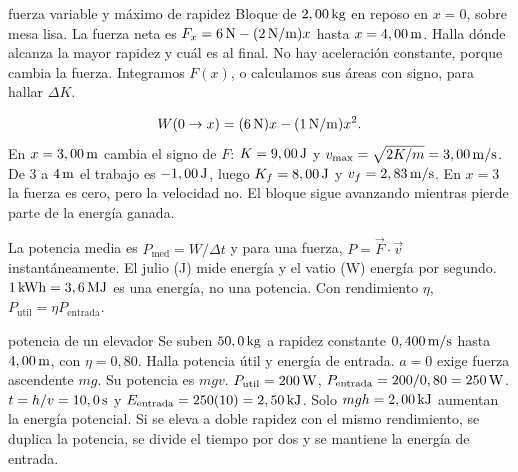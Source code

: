 \documentclass[11pt,a4paper]{article}
\begin{document}
\begin{examplebox}{fuerza variable y m\'aximo de rapidez}
 Bloque de $2,00\,\mathrm{kg}$ en reposo en $x=0$, sobre mesa lisa.
La fuerza neta es $F_x=6\,\mathrm{N}-(2\,\mathrm{N/m})x$ hasta $x=4,00\,\mathrm{m}$.
Halla d\'onde alcanza la mayor rapidez y cu\'al es al final.
\solutionblock
{} No hay aceleraci\'on constante, porque cambia la fuerza.
Integramos $F(x)$, o calculamos sus \'areas con signo, para hallar $\Delta K$.
\begin{center}
\end{center}
\[
W(0\to x)=(6\,\mathrm{N})x-(1\,\mathrm{N/m})x^2.
\]
En $x=3,00\,\mathrm{m}$ cambia el signo de $F$:
$K=9,00\,\mathrm{J}$ y $v_{\max}=\sqrt{2K/m}=3,00\,\mathrm{m/s}$.
De $3$ a $4\,\mathrm{m}$ el trabajo es $-1,00\,\mathrm{J}$, luego
$K_f=8,00\,\mathrm{J}$ y $v_f=2,83\,\mathrm{m/s}$.
 En $x=3$ la fuerza es cero, pero la velocidad no.
El bloque sigue avanzando mientras pierde parte de la energ\'ia ganada.
\end{examplebox}

La potencia media es $P_{\mathrm{med}}=W/\Delta t$ y para una fuerza,
$P=\vec F\cdot\vec v$ instant\'aneamente.
El julio (J) mide energ\'ia y el vatio (W) energ\'ia por segundo.
$1\,\mathrm{kWh}=3,6\,\mathrm{MJ}$ es una energ\'ia, no una potencia.
Con rendimiento $\eta$, $P_{\mathrm{util}}=\eta P_{\mathrm{entrada}}$.

\begin{examplebox}{potencia de un elevador}
 Se suben $50,0\,\mathrm{kg}$ a rapidez constante $0,400\,\mathrm{m/s}$
hasta $4,00\,\mathrm{m}$, con $\eta=0,80$. Halla potencia \'util y energ\'ia de entrada.
\solutionblock
{} $a=0$ exige fuerza ascendente $mg$. Su potencia es $mgv$.
 $P_{\mathrm{util}}=200\,\mathrm{W}$,
$P_{\mathrm{entrada}}=200/0,80=250\,\mathrm{W}$.
$t=h/v=10,0\,\mathrm{s}$ y $E_{\mathrm{entrada}}=250(10)=2,50\,\mathrm{kJ}$.
 Solo $mgh=2,00\,\mathrm{kJ}$ aumentan la energ\'ia potencial.
Si se eleva a doble rapidez con el mismo rendimiento, se duplica la potencia,
se divide el tiempo por dos y se mantiene la energ\'ia de entrada.
\end{examplebox}
\end{document}
